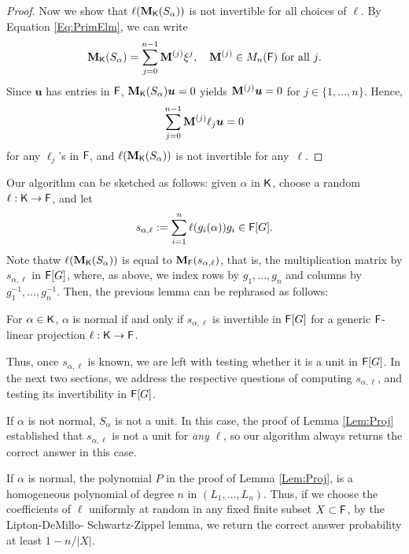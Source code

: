 \begin{proof}
  Now we show that $\ell(\mat M_\K(S_\alpha))$ is not invertible for all
  choices of $\ell$. By Equation \eqref{Eq:PrimElm}, we can write
  $$\mat M_\K(S_\alpha) = \sum_{j = 0}^{n-1} \mat M^{(j)} \xbar^j, \quad 
  \mat M^{(j)} \in M_{n}(\F) \text{~for all $j$}.$$ 
  Since $\boldsymbol{u}$ has entries in ${\mathsf{F}}$,
  $\mat M_\K(S_\alpha) \boldsymbol{u} =0$ yields
  $\mat M^{(j)}\boldsymbol{u} = 0$ for
  $j \in \lbrace 1, \ldots , n \rbrace$. Hence,
$$\sum_{j = 0}^{n-1} \mat M^{(j)} \ell_j \boldsymbol{u} = 0$$ for any 
$\ell_j$'s in ${\mathsf{F}}$, and $\ell(\mat M_\K(S_\alpha))$ is not invertible for any~$\ell$.
\end{proof} 
Our algorithm can be sketched as follows: given $\alpha$ in ${\mathsf{K}}$,
choose a random $\ell: {\mathsf{K}}\to{\mathsf{F}}$, and let
\begin{equation}\label{def:s_alpha_ell}
s_{\alpha,\ell}:=\sum_{i=1}^n \ell(g_i(\alpha))g_i \in {\mathsf{F}}[G].
\end{equation}
Note thatw $\ell(\mat M_\K(S_\alpha))$ is equal to $\mat
M_\F(s_{\alpha,\ell})$, that is, the multiplication matrix by
$s_{\alpha,\ell}$ in ${\mathsf{F}}[G]$, where, as above, we index rows by
$g_1,\dots,g_n$ and columns by $g_1^{-1},\dots,g_n^{-1}$.  Then,
the previous lemma can be rephrased as follows:
\begin{lemma}
  \label{Lem:Proj-bis}
  For $\alpha \in {\mathsf{K}}$, $\alpha$ is normal if and only if
  $s_{\alpha,\ell}$ is invertible in ${\mathsf{F}}[G]$ for a generic
  ${\mathsf{F}}$-linear projection $\ell: {\mathsf{K}} \to {\mathsf{F}}$.
\end{lemma}
Thus, once $s_{\alpha,\ell}$ is known, we are left with testing
whether it is a unit in ${\mathsf{F}}[G]$. In the next two sections, we address
the respective questions of computing $s_{\alpha,\ell}$, and testing
its invertibility in ${\mathsf{F}}[G]$.
\begin{remark}\label{rmk:mc-epsilon}
If $\alpha$ is not normal, $S_\alpha$ is not a unit. In this case, the
proof of Lemma \ref{Lem:Proj} established that $s_{\alpha,\ell}$ is
not a unit for {\em any} $\ell$, so our algorithm always returns the
correct answer in this case.

If $\alpha$ is normal, the polynomial $P$ in the proof of Lemma
\ref{Lem:Proj}, is a homogeneous polynomial of degree $n$ in $(L_1,
\ldots , L_n)$. Thus, if we choose the coefficients of $\ell$ uniformly at
random in any fixed finite subset $X \subset {\mathsf{F}}$, by the
Lipton-DeMillo- Schwartz-Zippel lemma, we return the correct 
answer probability at least $1-n/|X|$. 
\end{remark}





